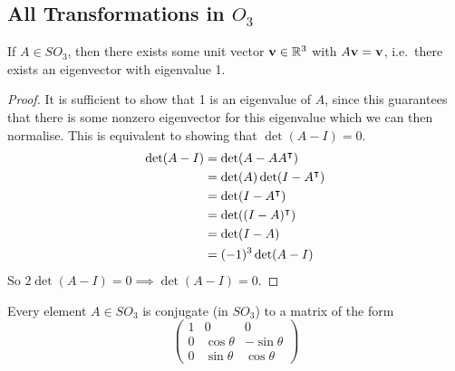 \subsection{All Transformations in \(O_3\)}
\begin{theorem}
	If \(A \in SO_3\), then there exists some unit vector \(\vb v \in \mathbb R^3\) with \(A\vb v = \vb v\), i.e.\ there exists an eigenvector with eigenvalue 1.
\end{theorem}
\begin{proof}
	It is sufficient to show that 1 is an eigenvalue of \(A\), since this guarantees that there is some nonzero eigenvector for this eigenvalue which we can then normalise.
	This is equivalent to showing that \(\det (A - I) = 0\).
	\begin{align*}
		\det(A - I) & = \det(A - AA^\intercal)       \\
		            & = \det(A)\det(I - A^\intercal) \\
		            & = \det(I - A^\intercal)        \\
		            & = \det((I - A)^\intercal)      \\
		            & = \det(I - A)                   \\
		            & = (-1)^3\det(A - I)
	\end{align*}
	So \(2\det(A - I) = 0 \implies \det(A - I) = 0\).
\end{proof}
\begin{corollary}
	Every element \(A \in SO_3\) is conjugate (in \(SO_3\)) to a matrix of the form
	\[
		\begin{pmatrix}
			1 & 0           & 0            \\
			0 & \cos \theta & -\sin \theta \\
			0 & \sin \theta & \cos \theta
		\end{pmatrix}
	\]
\end{corollary}
